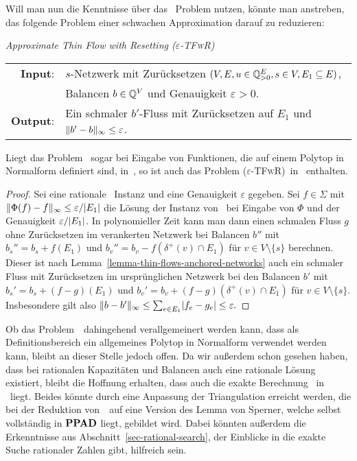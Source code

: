 Will man nun die Kenntnisse über das \Brouwer\ Problem nutzen, könnte man anstreben, das folgende Problem einer schwachen Approximation darauf zu reduzieren:

\newcommand{\epsTFwR}{\textsc{($\varepsilon$\nobreakdash-TFwR)}}
\begin{center}
	\begin{mdframed}
		\centering
		\emph{Approximate Thin Flow with Resetting \epsTFwR} \\[1em]
		\begin{tabular}{rl}
			{\bfseries Input}: &$s$-Netzwerk mit Zurücksetzen $(V, E, u \in \mathbb{Q}^E_{>0}, s\in V, E_1\subseteq E)$,\\
			& Balancen $b\in \mathbb{Q}^V$ und Genauigkeit $\varepsilon > 0$.\\
			{\bfseries Output}: &Ein schmaler $b'$-Fluss mit Zurücksetzen auf $E_1$ und $\lVert b' - b\rVert_\infty \leq \varepsilon$.
		\end{tabular}
	\end{mdframed}
\end{center}

\begin{lemma}
	Liegt das Problem \Brouwer\ sogar bei Eingabe von Funktionen, die auf einem Polytop in Normalform definiert sind, in~\PPAD, so ist auch das Problem \epsTFwR\ in \PPAD\ enthalten.
\end{lemma}
\begin{proof}
	Sei eine rationale \problemThinFlow\ Instanz und eine Genauigkeit $\varepsilon$ gegeben.
	Sei $f\in \Sigma$ mit $\lVert\Phi(f) - f\rVert_\infty \leq \varepsilon / \lvert E_1\rvert$ die Lösung der Instanz von \Brouwer\ bei Eingabe von $\Phi$ und der Genauigkeit $\varepsilon/\lvert E_1\rvert$.
	In polynomieller Zeit kann man dann einen schmalen Fluss $g$ ohne Zurücksetzen im verankerten Netzwerk bei Balancen $b''$ mit $b_s'' = b_s + f(E_1)$ und $b_v'' = b_v - f(\delta^+(v)\cap E_1)$ für $v\in V\setminus\{ s \}$ berechnen.
	Dieser ist nach Lemma~\ref{lemma-thin-flows-anchored-networks} auch ein schmaler Fluss mit Zurücksetzen im ursprünglichen Netzwerk bei den Balancen $b'$ mit $b_s' = b_s + (f-g)(E_1)$ und $b_v' = b_v + (f-g)(\delta^+(v)\cap E_1)$ für $v\in V\setminus\{s\}$.
	Insbesondere gilt also 
	\(
	\lVert b - b'\rVert_\infty \leq \sum_{e \in E_1} \lvert f_e - g_e\rvert \leq \varepsilon.
	\)
\end{proof}

Ob das Problem~\Brouwer\ dahingehend verallgemeinert werden kann, dass als Definitionsbereich ein allgemeines Polytop in Normalform verwendet werden kann, bleibt an dieser Stelle jedoch offen.
Da wir außerdem schon gesehen haben, dass bei rationalen Kapazitäten und Balancen auch eine rationale Lösung existiert, bleibt die Hoffnung erhalten, dass auch die exakte Berechnung \probTFwR\ in \PPAD\ liegt.
Beides könnte durch eine Anpassung der Triangulation erreicht werden, die bei der Reduktion von~\Brouwer\ auf eine Version des Lemma von Sperner, welche selbst vollständig in $\textbf{PPAD}$ liegt, gebildet wird.
Dabei könnten außerdem die Erkenntnisse aus Abschnitt~\ref{sec-rational-search}, der Einblicke in die exakte Suche rationaler Zahlen gibt, hilfreich sein.